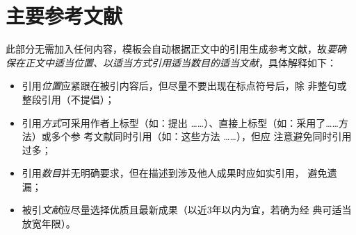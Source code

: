 \section{主要参考文献}

\begin{tcolorbox}
	此部分无需加入任何内容，模板会自动根据正文中的引用生成参考文献，故\emph{要确
		保在正文中适当位置、以适当方式引用适当数目的适当文献}，具体解释如下：
	\begin{itemize}
		\item 引用\emph{位置}应紧跟在被引内容后，但尽量不要出现在标点符号后，除
		      非整句或整段引用（不提倡）；
		\item 引用\emph{方式}可采用作者上标型（如：\citet{chen1980zhongguo}提出
		      ……）、直接上标型（如：采用了……方法\citep{chen2005zhulu}）或多个参
		      考文献同时引用（如：这些方法
		      \citep{Bohan1928,chu2004tushu,Dubrovin1906,hls2012jinji}……），但应
		      注意避免同时引用过多；
		\item 引用\emph{数目}并无明确要求，但在描述到涉及他人成果时应如实引用，
		      避免遗漏；
		\item 被引\emph{文献}应尽量选择优质且最新成果（以近3年以内为宜，若确为经
		      典可适当放宽年限）。
	\end{itemize}
\end{tcolorbox}